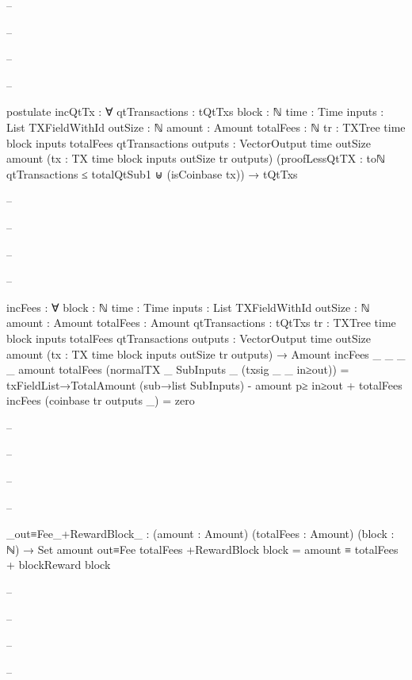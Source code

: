 \documentclass{beamer}
\begin{document}
{\begin{frame}
\begin{code}
-- \end{code}
-- \end{frame}
-- \begin{frame}
-- \begin{code}

        postulate
          incQtTx : ∀ {qtTransactions : tQtTxs}
            {block : ℕ} {time : Time}
            {inputs : List TXFieldWithId}
            {outSize : ℕ} {amount : Amount}
            {totalFees : ℕ}
            {tr : TXTree time block inputs totalFees qtTransactions}
            {outputs : VectorOutput time outSize amount}
            (tx : TX {time} {block} {inputs} {outSize} tr outputs)
            (proofLessQtTX :
                toℕ qtTransactions ≤ totalQtSub1
                ⊎
                (isCoinbase tx))
            → tQtTxs

-- \end{code}
-- \end{frame}
-- \begin{frame}
-- \begin{code}

        incFees : ∀ {block : ℕ} {time : Time}
          {inputs : List TXFieldWithId}
          {outSize : ℕ} {amount : Amount}
          {totalFees : Amount} {qtTransactions : tQtTxs}
          {tr : TXTree time block inputs totalFees qtTransactions}
          {outputs : VectorOutput time outSize amount}
          (tx : TX {time} {block} {inputs} {outSize} tr outputs)
          → Amount
        incFees {_} {_} {_} {_} {amount} {totalFees}
          (normalTX _ SubInputs _ (txsig _ _ in≥out)) =
          txFieldList→TotalAmount (sub→list SubInputs)
          - amount p≥ in≥out
          + totalFees
        incFees (coinbase tr outputs _) = zero

-- \end{code}
-- \end{frame}
-- \begin{frame}
-- \begin{code}

        _out≡Fee_+RewardBlock_ : (amount : Amount)
          (totalFees : Amount)
          (block : ℕ) → Set
        amount out≡Fee totalFees +RewardBlock block =
          amount ≡ totalFees + blockReward block

-- \end{code}
-- \end{frame}
-- \begin{frame}
-- \begin{code}



\end{code}
\end{frame}}
\end{document}
